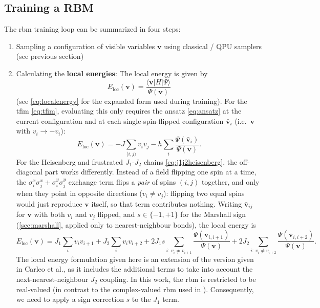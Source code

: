 \documentclass[10pt,a4paper]{article}
\numberwithin{equation}{section}
\begin{document}
\subsection{Training a RBM}
The \gls{rbm} training loop can be summarized in four steps:
\begin{enumerate}
\item Sampling a configuration of visible variables $\mathbf{v}$ using classical / QPU samplers (see previous section)
\item Calculating the \textbf{local energies}: The local energy is given by\cite{Gardas_2018}
\begin{equation}
E_\text{loc}(\mathbf v)=\frac{\langle \mathbf v|H|\Psi\rangle}{\Psi(\mathbf v)}
\end{equation}
(see \autoref{eq:localenergy} for the expanded form used during training). For the \gls{tfim} \eqref{eq:tfim}, evaluating this only requires the ansatz \eqref{eq:ansatz} at the current configuration and at each single-spin-flipped configuration $\bar{\mathbf v}_i$ (i.e.\ $\mathbf v$ with $v_i \to -v_i$)\cite{Gardas_2018,Carleo_2017}:
\begin{equation}
E_\text{loc}(\mathbf v) = -J\sum_{\langle i,j\rangle} v_i v_j - h\sum_i \frac{\Psi(\bar{\mathbf v}_i)}{\Psi(\mathbf v)}.
\end{equation}
For the Heisenberg and frustrated $J_1$-$J_2$ chains \eqref{eq:j1j2heisenberg}, the off-diagonal part works differently\cite{Carleo_2017,Sorella_1998}. Instead of a field flipping one spin at a time, the $\sigma^x_i\sigma^x_j+\sigma^y_i\sigma^y_j$ exchange term flips a \emph{pair} of spins $(i,j)$ together, and only when they point in opposite directions ($v_i\neq v_j$): flipping two equal spins would just reproduce $\mathbf v$ itself, so that term contributes nothing. Writing $\bar{\mathbf v}_{ij}$ for $\mathbf v$ with both $v_i$ and $v_j$ flipped, and $s\in\{-1,+1\}$ for the Marshall sign (\autoref{sec:marshall}, applied only to nearest-neighbour bonds), the local energy is
\begin{equation}
E_\text{loc}(\mathbf v) = J_1\sum_i v_iv_{i+1} + J_2\sum_i v_iv_{i+2}
 + 2J_1 s\!\!\sum_{i:\,v_i\neq v_{i+1}}\!\!\frac{\Psi(\bar{\mathbf v}_{i,i+1})}{\Psi(\mathbf v)}
 + 2J_2\!\!\sum_{i:\,v_i\neq v_{i+2}}\!\!\frac{\Psi(\bar{\mathbf v}_{i,i+2})}{\Psi(\mathbf v)}.
\end{equation}
The local energy formulation given here is an extension of the version given in Carleo et al.\cite{Carleo_2017}, as it includes the additional terms to take into account the next-nearest-neighbour $J_2$ coupling\cite{Sorella_1998}. In this work, the \gls{rbm} is restricted to be real-valued (in contrast to the complex-valued \gls{rbm} used in \cite{Carleo_2017}). Consequently, we need to apply a sign correction $s$ to the $J_1$ term.


\end{enumerate}
\end{document}
